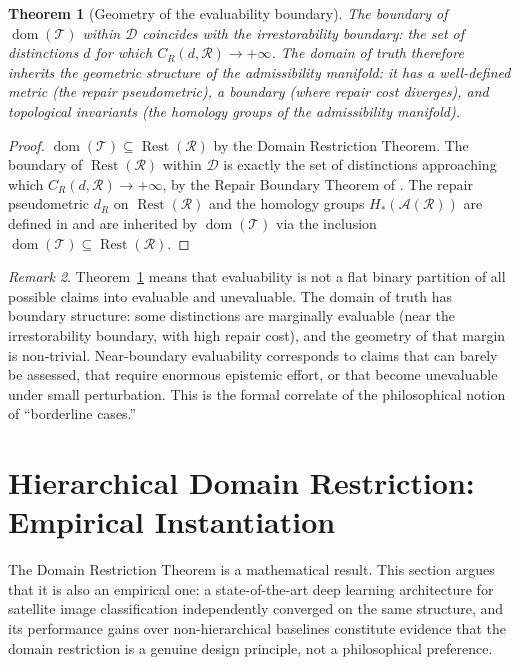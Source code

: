 \documentclass[12pt, oneside]{article}
\theoremstyle{plain}
\newtheorem{theorem}{Theorem}[section]
\theoremstyle{definition}
\theoremstyle{remark}
\newtheorem{remark}[theorem]{Remark}
\DeclareMathOperator{\Rest}{Rest}
\newcommand{\CR}{C_{\!R}}
\newcommand{\AO}{\mathcal{A}}
\newcommand{\Dsub}{\mathcal{D}}
\newcommand{\Tsub}{\mathcal{T}}
\newcommand{\RestR}{\Rest(\mathcal{R})}
\begin{document}
\begin{theorem}[Geometry of the evaluability boundary]
  The boundary of $\operatorname{dom}(\Tsub)$ within $\Dsub$
  coincides with the irrestorability boundary: the set of
  distinctions $d$ for which $\CR(d, \mathcal{R}) \to +\infty$.
  The domain of truth therefore inherits the geometric structure
  of the admissibility manifold: it has a well-defined metric
  (the repair pseudometric), a boundary (where repair cost
  diverges), and topological invariants (the homology groups of
  the admissibility manifold).
  \label{thm:evaluability-geometry}
\end{theorem}

\begin{proof}
  $\operatorname{dom}(\Tsub) \subseteq \RestR$ by the Domain
  Restriction Theorem.
  The boundary of $\RestR$ within $\Dsub$ is exactly the set of
  distinctions approaching which $\CR(d, \mathcal{R}) \to +\infty$,
  by the Repair Boundary Theorem of \cite{Flyxion2026a}.
  The repair pseudometric $d_R$ on $\RestR$ and the homology groups
  $H_*(\AO(\mathcal{R}))$ are defined in \cite{Flyxion2026a,Flyxion2026b}
  and are inherited by $\operatorname{dom}(\Tsub)$ via the inclusion
  $\operatorname{dom}(\Tsub) \subseteq \RestR$.
\end{proof}

\begin{remark}
  Theorem~\ref{thm:evaluability-geometry} means that evaluability
  is not a flat binary partition of all possible claims into
  evaluable and unevaluable.
  The domain of truth has boundary structure: some distinctions are
  marginally evaluable (near the irrestorability boundary, with high
  repair cost), and the geometry of that margin is non-trivial.
  Near-boundary evaluability corresponds to claims that can barely
  be assessed, that require enormous epistemic effort, or that
  become unevaluable under small perturbation.
  This is the formal correlate of the philosophical notion of
  ``borderline cases.''
\end{remark}


\section{Hierarchical Domain Restriction: Empirical Instantiation}
\label{sec:sahc}

The Domain Restriction Theorem is a mathematical result.
This section argues that it is also an empirical one: a
state-of-the-art deep learning architecture for satellite image
classification independently converged on the same structure,
and its performance gains over non-hierarchical baselines
constitute evidence that the domain restriction is a
genuine design principle, not a philosophical preference.
\end{document}
